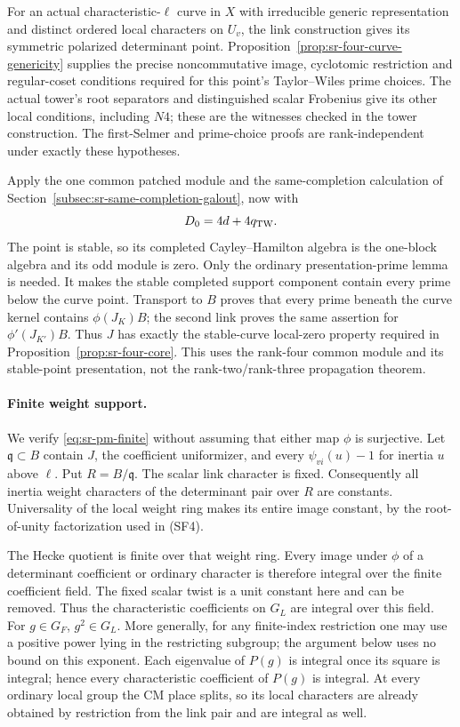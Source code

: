 For an actual characteristic-\(\ell\) curve in \(X\) with
irreducible generic representation and distinct ordered local
characters on \(U_v\), the link construction gives its
symmetric polarized determinant point.
Proposition~\ref{prop:sr-four-curve-genericity} supplies the
precise noncommutative image, cyclotomic restriction and
regular-coset conditions required for this point's
Taylor--Wiles prime choices.
The actual tower's root separators and distinguished scalar
Frobenius give its other local conditions, including \(N4\);
these are the witnesses checked in the tower construction.
The first-Selmer and prime-choice proofs are rank-independent
under exactly these hypotheses.

Apply the one common patched module and the same-completion
calculation of Section~\ref{subsec:sr-same-completion-galout},
now with
\[
                   D_0=4d+4q_{\rm TW}.
\]
The point is stable, so its completed Cayley--Hamilton algebra
is the one-block algebra and its odd module is zero.
Only the ordinary presentation-prime lemma is needed.
It makes the stable completed support component contain every
prime below the curve point.
Transport to \(B\) proves that every prime beneath the curve
kernel contains \(\phi(J_K)B\); the second link proves the
same assertion for \(\phi'(J_{K'})B\).
Thus \(J\) has exactly the stable-curve local-zero property
required in Proposition~\ref{prop:sr-four-core}.
This uses the rank-four common module and its stable-point
presentation, not the rank-two/rank-three propagation theorem.

\paragraph{Finite weight support.}
We verify \eqref{eq:sr-pm-finite} without assuming that either
map \(\phi\) is surjective.
Let \(\mathfrak q\subset B\) contain \(J\), the coefficient
uniformizer, and every \(\psi_{vi}(u)-1\) for inertia \(u\)
above \(\ell\). Put \(R=B/\mathfrak q\).
The scalar link character is fixed.
Consequently all inertia weight characters of the determinant
pair over \(R\) are constants.
Universality of the local weight ring makes its entire image
constant, by the root-of-unity factorization used in (SF4).

The Hecke quotient is finite over that weight ring.
Every image under \(\phi\) of a determinant coefficient or
ordinary character is therefore integral over the finite
coefficient field.
The fixed scalar twist is a unit constant here and can be
removed. Thus the characteristic coefficients on \(G_L\)
are integral over this field.
For \(g\in G_F\), \(g^2\in G_L\).
More generally, for any finite-index restriction one may use a
positive power lying in the restricting subgroup; the argument
below uses no bound on this exponent.
Each eigenvalue of \(P(g)\) is integral once its square is
integral; hence every characteristic coefficient of \(P(g)\)
is integral.
At every ordinary local group the CM place splits, so its
local characters are already obtained by restriction from
the link pair and are integral as well.

